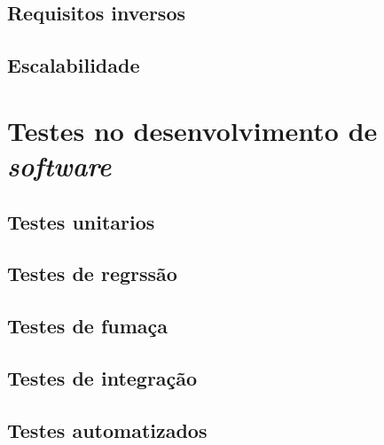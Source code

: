 \documentclass[]{../class/politex}
\begin{document}
      \subsection{Requisitos inversos}

      \subsection{Escalabilidade}

    \section{Testes no desenvolvimento de \textit{software}}

      \subsection{Testes unitarios}

      \subsection{Testes de regrssão}

      \subsection{Testes de fumaça}

      \subsection{Testes de integração}

      \subsection{Testes automatizados}

  

  

  

  

  
\end{document}
